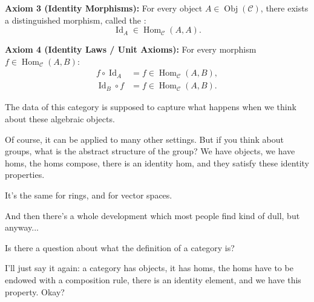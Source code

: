 \begin{content}
\textbf{Axiom 3 (Identity Morphisms):} For every object $A \in \operatorname{Obj}(\mathcal{C})$, there exists a distinguished morphism, called the :
\[
\operatorname{Id}_A \in \operatorname{Hom}_{\mathcal{C}}(A, A).
\]

\textbf{Axiom 4 (Identity Laws / Unit Axioms):}
For every morphism $f \in \operatorname{Hom}_{\mathcal{C}}(A, B)$:
\begin{align}
f \circ \operatorname{Id}_A &= f \in \operatorname{Hom}_{\mathcal{C}}(A, B), \label{eq:left-id} \\
\operatorname{Id}_B \circ f &= f \in \operatorname{Hom}_{\mathcal{C}}(A, B). \label{eq:right-id}
\end{align}
\end{content}

\begin{speech}[01:16:30 - 01:17:26]
The data of this category is supposed to capture what happens when we think about these algebraic objects.

Of course, it can be applied to many other settings. But if you think about groups, what is the abstract structure of the group? We have objects, we have homs, the homs compose, there is an identity hom, and they satisfy these identity properties.

It's the same for rings, and for vector spaces.

And then there's a whole development which most people find kind of dull, but anyway...

Is there a question about what the definition of a category is?

I'll just say it again: a category has objects, it has homs, the homs have to be endowed with a composition rule, there is an identity element, and we have this property. Okay?
\end{speech}


